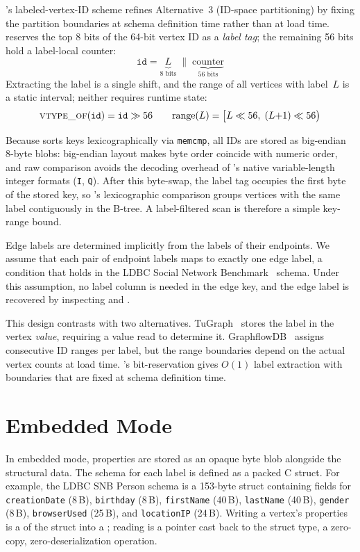 \project{}'s labeled-vertex-ID scheme refines Alternative~3 (ID-space partitioning) by fixing the partition boundaries at schema definition time rather than at load time.
\project{} reserves the top 8 bits of the 64-bit vertex ID as a \emph{label tag}; the remaining 56 bits hold a label-local counter:
\[
  \texttt{id} = \underbrace{L}_{\text{8 bits}} \;\|\; \underbrace{\text{counter}}_{\text{56 bits}}
\]
Extracting the label is a single shift, and the range of all vertices with label~$L$ is a static interval; neither requires runtime state:
\[
  \textsc{vtype\_of}(\texttt{id}) = \texttt{id} \gg 56
  \qquad
  \text{range}(L) = \bigl[L \ll 56,\; (L{+}1) \ll 56\bigr)
\]

Because \wt{} sorts keys lexicographically via \texttt{memcmp}, all IDs are stored as big-endian 8-byte blobs: big-endian layout makes byte order coincide with numeric order, and raw comparison avoids the decoding overhead of \wt{}'s native variable-length integer formats (\texttt{I}, \texttt{Q}).
After this byte-swap, the label tag occupies the first byte of the stored key, so \wt{}'s lexicographic comparison groups vertices with the same label contiguously in the B-tree.
A label-filtered scan is therefore a simple key-range bound.

Edge labels are determined implicitly from the labels of their endpoints.
We assume that each pair of endpoint labels maps to exactly one edge label, a condition that holds in the LDBC Social Network Benchmark~\cite{erling2015ldbc} schema.
Under this assumption, no label column is needed in the edge key, and the edge label is recovered by inspecting  and .

This design contrasts with two alternatives.
TuGraph~\cite{linBuildingHighPerformanceGraph2024} stores the label in the vertex \emph{value}, requiring a value read to determine it.
GraphflowDB~\cite{graphflowdb2021Gupta} assigns consecutive ID ranges per label, but the range boundaries depend on the actual vertex counts at load time.
\project{}'s bit-reservation gives $O(1)$ label extraction with boundaries that are fixed at schema definition time.

\section{Embedded Mode}
\label{arch:prop-embedded}

In embedded mode, properties are stored as an opaque byte blob alongside the structural data.
The schema for each label is defined as a packed C struct.
For example, the LDBC SNB Person schema is a 153-byte struct containing fields for \texttt{creationDate} (8\,B), \texttt{birthday} (8\,B), \texttt{firstName} (40\,B), \texttt{lastName} (40\,B), \texttt{gender} (8\,B), \texttt{browserUsed} (25\,B), and \texttt{locationIP} (24\,B).
Writing a vertex's properties is a  of the struct into a \wt{} ; reading is a pointer cast back to the struct type, a zero-copy, zero-deserialization operation.

